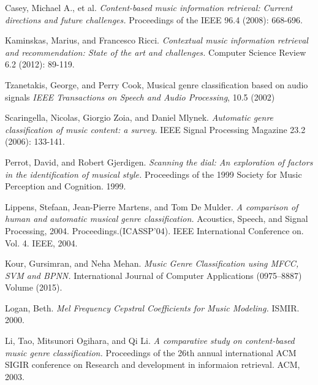 \begin{thebibliography}{9}
                Casey, Michael A., et al. 
                \emph{Content-based music information retrieval: Current directions and future challenges.} 
                Proceedings of the IEEE 96.4 (2008): 668-696.

                Kaminskas, Marius, and Francesco Ricci.
                \emph{Contextual music information retrieval and recommendation: State of the art and challenges.} 
                Computer Science Review 6.2 (2012): 89-119.

                Tzanetakis, George, and Perry Cook, Musical genre classification based on audio signals
                \emph{IEEE Transactions on Speech and Audio Processing},
                10.5 (2002)

                Scaringella, Nicolas, Giorgio Zoia, and Daniel Mlynek. 
                \emph{Automatic genre classification of music content: a survey.} 
                IEEE Signal Processing Magazine 23.2 (2006): 133-141.

                Perrot, David, and Robert Gjerdigen. 
                \emph{Scanning the dial: An exploration of factors in the identification of musical style.} 
                Proceedings of the 1999 Society for Music Perception and Cognition. 1999.

                Lippens, Stefaan, Jean-Pierre Martens, and Tom De Mulder. 
                \emph{A comparison of human and automatic musical genre classification.} 
                Acoustics, Speech, and Signal Processing, 2004. Proceedings.(ICASSP'04). IEEE International Conference on. Vol. 4. IEEE, 2004.

                Kour, Gursimran, and Neha Mehan. 
                \emph{Music Genre Classification using MFCC, SVM and BPNN.} 
                International Journal of Computer Applications (0975–8887) Volume (2015).

                Logan, Beth. 
                \emph{Mel Frequency Cepstral Coefficients for Music Modeling.} 
                ISMIR. 2000.

                Li, Tao, Mitsunori Ogihara, and Qi Li. 
                \emph{A comparative study on content-based music genre classification.} 
                Proceedings of the 26th annual international ACM SIGIR conference on Research and development in informaion retrieval. ACM, 2003.


\end{thebibliography}
